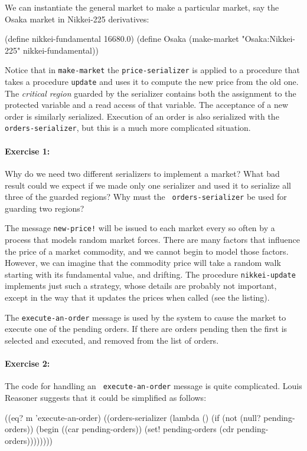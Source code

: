 We can instantiate the general market to make a particular market, say
the Osaka market in Nikkei-225 derivatives:

\beginlisp
(define nikkei-fundamental 16680.0)
\null
(define Osaka
  (make-market "Osaka:Nikkei-225" nikkei-fundamental))
\endlisp

Notice that in {\tt make-market} the {\tt price-serializer} is applied
to a procedure that takes a procedure {\tt update} and uses it to
compute the new price from the old one.  The {\em critical region}
guarded by the serializer contains both the assignment to the
protected variable and a read access of that variable.  The acceptance
of a new order is similarly serialized.  Execution of an order is also
serialized with the {\tt orders-serializer}, but this is a much more
complicated situation.

\paragraph{Exercise 1:}
Why do we need two different serializers to implement a market?  What
bad result could we expect if we made only one serializer and used it
to serialize all three of the guarded regions?  Why must the {\tt
orders-serializer} be used for guarding two regions?

The message {\tt new-price!} will be issued to each market every so
often by a process that models random market forces.  There are many
factors that influence the price of a market commodity, and we cannot
begin to model those factors.  However, we can imagine that the
commodity price will take a random walk starting with its fundamental
value, and drifting.  The procedure {\tt nikkei-update} implements
just such a strategy, whose details are probably not important, except
in the way that it updates the prices when called (see the listing).

The {\tt execute-an-order} message is used by the system to cause the
market to execute one of the pending orders.  If there are orders
pending then the first is selected and executed, and removed from the
list of orders.

\paragraph{Exercise 2:}
The code for handling an {\tt
execute-an-order} message is quite complicated.  Louis Reasoner
suggests that it could be simplified as follows:

\beginlisp
     ((eq? m 'execute-an-order)
      ((orders-serializer
        (lambda ()
          (if (not (null? pending-orders))
              (begin ((car pending-orders))
                     (set! pending-orders (cdr pending-orders))))))))
\endlisp

